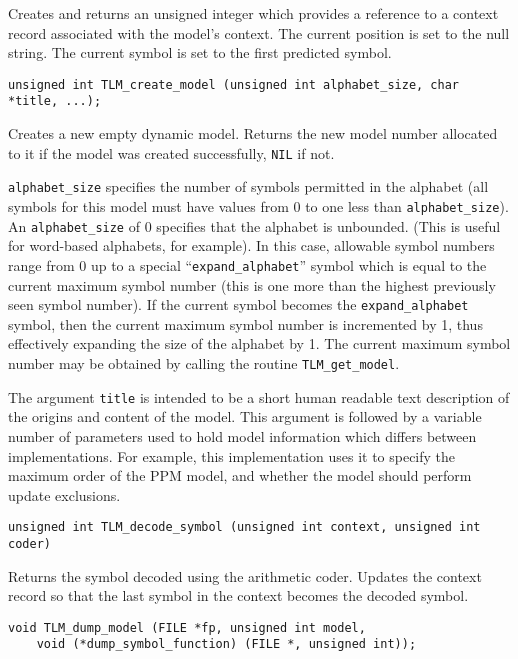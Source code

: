 \documentclass[11pt]{article}
\begin{document}
{\vspace{-0.2cm}
Creates and returns an unsigned integer which provides a reference to a
context record associated with the model's context. The current position is
set to the null string. The current symbol is set to the first predicted
symbol.

\begin{verbatim}
unsigned int TLM_create_model (unsigned int alphabet_size, char *title, ...);
\end{verbatim}

\vspace{-0.2cm}
Creates a new empty dynamic model. Returns the new model number allocated
to it if the model was created successfully, \verb|NIL| if not.

\verb|alphabet_size| specifies the number
of symbols permitted in the alphabet (all symbols for this model must have
values from 0 to one less than \verb|alphabet_size|).
An \verb|alphabet_size| of 0 specifies that the alphabet is unbounded.
(This is useful for word-based alphabets, for example). In this case,
allowable symbol numbers range from 0 up to a special ``\verb|expand_alphabet|''
symbol which is equal to the current maximum symbol number (this is one more
than the highest previously seen symbol number). If the current symbol
becomes the \verb|expand_alphabet| symbol, then the
current maximum symbol number is incremented by 1, thus effectively expanding
the size of the alphabet by 1. The current maximum symbol number may be
obtained by calling the routine \verb|TLM_get_model|.

The argument \verb|title| is intended to be a short human readable text description
of the origins and content of the model. This argument is followed by a
variable number of parameters used to hold model information which differs
between implementations. For example, this implementation uses it to specify
the maximum order of the PPM model, and whether the model should perform
update exclusions.

\begin{verbatim}
unsigned int TLM_decode_symbol (unsigned int context, unsigned int coder)
\end{verbatim}

\vspace{-0.2cm}
Returns the symbol decoded using the arithmetic coder. Updates the
context record so that the last symbol in the context becomes the
decoded symbol.

\begin{verbatim}
void TLM_dump_model (FILE *fp, unsigned int model,
    void (*dump_symbol_function) (FILE *, unsigned int));
\end{verbatim}

}
\end{document}

